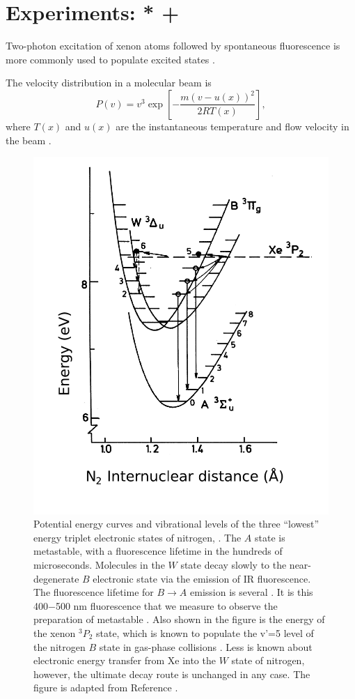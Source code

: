 \documentclass[12pt]{mitthesis}
\begin{document}
\section{Experiments: * + }

Two-photon excitation of xenon atoms followed by spontaneous
fluorescence is more commonly used to populate excited states \cite{alekseev96}.

The velocity distribution in a molecular beam is
\begin{equation}
  P(v) = v^3 \exp 
  \left [
    -\frac{m(v-u(x))^2}{2RT(x)}
  \right ],
\end{equation}
where $T(x)$ and $u(x)$ are the instantaneous temperature and flow
velocity in the beam \cite{morse96}.

\begin{figure}
  \caption{Potential energy curves and vibrational levels of the three
    ``lowest'' energy triplet electronic states of nitrogen, .
    The $A$ state is metastable, with a fluorescence lifetime in the
    hundreds of microseconds.  Molecules in the $W$ state decay slowly
    to the near-degenerate $B$ electronic state via the emission of IR
    fluorescence.  The fluorescence lifetime for $B \rightarrow A$
    emission is several \microsec. It is this 400$-$500 nm
    fluorescence that we measure to observe the preparation of
    metastable .  Also shown in the figure is the energy of the
    xenon $^3P_2$ state, which is known to populate the v'=5 level of
    the nitrogen $B$ state in gas-phase collisions
    \cite{krumpelmann87}.  Less is known about electronic energy
    transfer from Xe into the $W$ state of nitrogen, however, the
    ultimate decay route is unchanged in any case.  The figure is
    adapted from Reference \cite{krumpelmann-thesis}.}
  \label{fig:n2curves}
  \centering
  \includegraphics[width=5in]{n2curves.pdf}

\end{figure}
\end{document}
